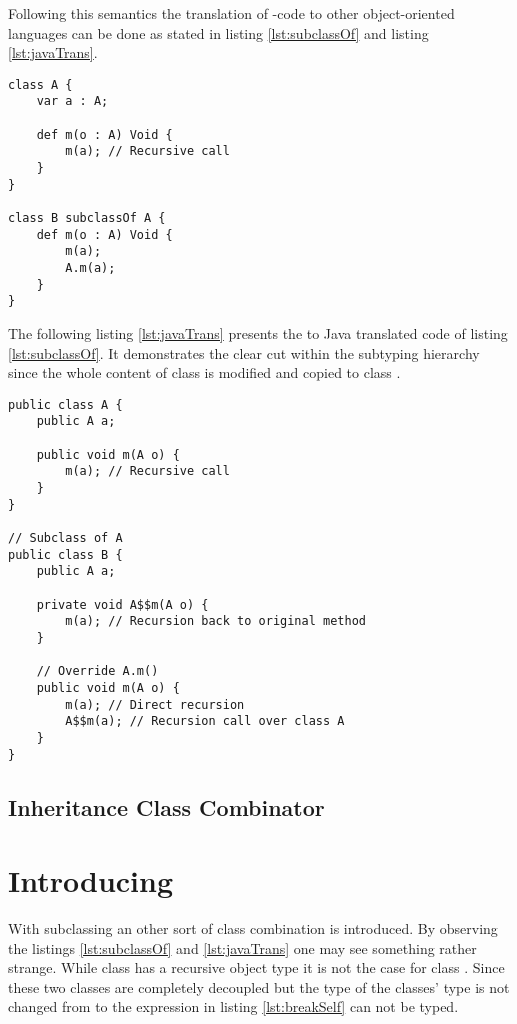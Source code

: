 
Following this semantics the translation of \ooplss-code to
other object-oriented languages can be done as stated in listing
\ref{lst:subclassOf} and listing \ref{lst:javaTrans}.

\begin{lstlisting}[float,language=ooplss,caption=Subclassing in \ooplss,label=lst:subclassOf]
class A {
	var a : A;

	def m(o : A) Void {
		m(a); // Recursive call
	}
}

class B subclassOf A {
	def m(o : A) Void {
		m(a);
		A.m(a);
	}
}
\end{lstlisting}

The following listing \ref{lst:javaTrans} presents the to Java translated
code of listing \ref{lst:subclassOf}. It demonstrates the clear cut within 
the subtyping hierarchy since the whole content of class \A is modified
and copied to class \B.

\begin{lstlisting}[float,caption=Subclassing translated in Java,label=lst:javaTrans]
public class A {
	public A a;

	public void m(A o) {
		m(a); // Recursive call
	}
}

// Subclass of A
public class B {
	public A a;

	private void A$$m(A o) {
		m(a); // Recursion back to original method
	}

	// Override A.m()
	public void m(A o) {
		m(a); // Direct recursion
		A$$m(a); // Recursion call over class A
	}
}
\end{lstlisting}

\subsection{Inheritance Class Combinator}

\section{Introducing \mytype}
With subclassing an other sort of class combination is introduced. By
observing the listings \ref{lst:subclassOf} and \ref{lst:javaTrans}
one may see something rather strange. While class \A has a recursive
object type it is not the case for class \B. Since these two classes are
completely decoupled but the type of the classes' type is not changed from
\A to \B the expression in listing \ref{lst:breakSelf} can not be typed.

